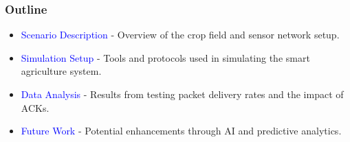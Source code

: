 \begin{frame}
    \frametitle{Outline}
    \begin{itemize}
        \item[\faFileTextO] \textcolor{blue}{Scenario Description} - Overview of the crop field and sensor network setup.
        \item[\faCogs] \textcolor{blue}{Simulation Setup} - Tools and protocols used in simulating the smart agriculture system.
        \item[\faBarChart] \textcolor{blue}{Data Analysis} - Results from testing packet delivery rates and the impact of ACKs.
        \item[\faLightbulbO] \textcolor{blue}{Future Work} - Potential enhancements through AI and predictive analytics.
    \end{itemize}
\end{frame}

